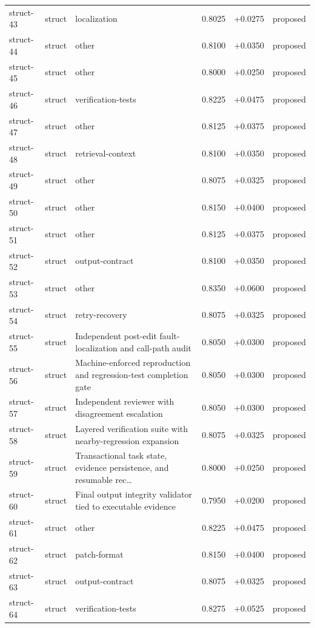 \begin{center}
\begin{longtable}{llp{5.2cm}rrl}
struct-43 & struct & localization & 0.8025 & +0.0275 & proposed \\
struct-44 & struct & other & 0.8100 & +0.0350 & proposed \\
struct-45 & struct & other & 0.8000 & +0.0250 & proposed \\
struct-46 & struct & verification-tests & 0.8225 & +0.0475 & proposed \\
struct-47 & struct & other & 0.8125 & +0.0375 & proposed \\
struct-48 & struct & retrieval-context & 0.8100 & +0.0350 & proposed \\
struct-49 & struct & other & 0.8075 & +0.0325 & proposed \\
struct-50 & struct & other & 0.8150 & +0.0400 & proposed \\
struct-51 & struct & other & 0.8125 & +0.0375 & proposed \\
struct-52 & struct & output-contract & 0.8100 & +0.0350 & proposed \\
struct-53 & struct & other & 0.8350 & +0.0600 & proposed \\
struct-54 & struct & retry-recovery & 0.8075 & +0.0325 & proposed \\
struct-55 & struct & Independent post-edit fault-localization and call-path audit & 0.8050 & +0.0300 & proposed \\
struct-56 & struct & Machine-enforced reproduction and regression-test completion gate & 0.8050 & +0.0300 & proposed \\
struct-57 & struct & Independent reviewer with disagreement escalation & 0.8050 & +0.0300 & proposed \\
struct-58 & struct & Layered verification suite with nearby-regression expansion & 0.8075 & +0.0325 & proposed \\
struct-59 & struct & Transactional task state, evidence persistence, and resumable rec\ldots{} & 0.8000 & +0.0250 & proposed \\
struct-60 & struct & Final output integrity validator tied to executable evidence & 0.7950 & +0.0200 & proposed \\
struct-61 & struct & other & 0.8225 & +0.0475 & proposed \\
struct-62 & struct & patch-format & 0.8150 & +0.0400 & proposed \\
struct-63 & struct & output-contract & 0.8075 & +0.0325 & proposed \\
struct-64 & struct & verification-tests & 0.8275 & +0.0525 & proposed \\

\end{longtable}
\end{center}
